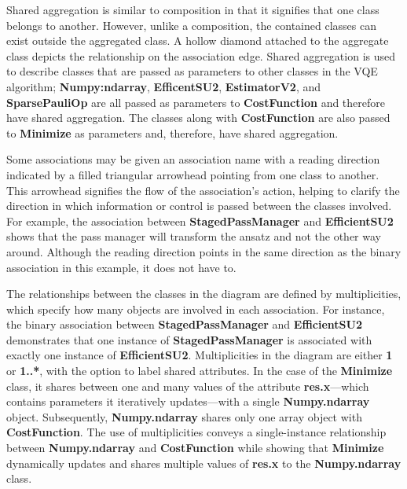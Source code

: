 \documentclass{article}
\begin{document}
Shared aggregation is similar to composition in that it signifies that one class belongs to another\cite{Seidl_Scholz_Huemer_Kappel_Duffy_2014}. However, unlike a composition, the contained classes can exist outside the aggregated class. A hollow diamond attached to the aggregate class depicts the relationship on the association edge. Shared aggregation is used to describe classes that are passed as parameters to other classes in the VQE algorithm; \textbf{Numpy:ndarray}, \textbf{EfficentSU2}, \textbf{EstimatorV2}, and \textbf{SparsePauliOp} are all passed as parameters to \textbf{CostFunction} and therefore have shared aggregation. The classes along with \textbf{CostFunction} are also passed to \textbf{Minimize} as parameters and, therefore, have shared aggregation. 

Some associations may be given an association name with a reading direction indicated by a filled triangular arrowhead pointing from one class to another. This arrowhead signifies the flow of the association's action, helping to clarify the direction in which information or control is passed between the classes involved. For example, the association between \textbf{StagedPassManager} and \textbf{EfficientSU2} shows that the pass manager will transform the ansatz and not the other way around. Although the reading direction points in the same direction as the binary association in this example, it does not have to\cite{Seidl_Scholz_Huemer_Kappel_Duffy_2014}.

The relationships between the classes in the diagram are defined by multiplicities, which specify how many objects are involved in each association. For instance, the binary association between \textbf{StagedPassManager} and \textbf{EfficientSU2} demonstrates that one instance of \textbf{StagedPassManager} is associated with exactly one instance of \textbf{EfficientSU2}. Multiplicities in the diagram are either \textbf{1} or \textbf{1..*}, with the option to label shared attributes. In the case of the \textbf{Minimize} class, it shares between one and many values of the attribute \textbf{res.x}—which contains parameters it iteratively updates—with a single \textbf{Numpy.ndarray} object. Subsequently, \textbf{Numpy.ndarray} shares only one array object with \textbf{CostFunction}. The use of multiplicities conveys a single-instance relationship between \textbf{Numpy.ndarray} and \textbf{CostFunction} while showing that \textbf{Minimize} dynamically updates and shares multiple values of \textbf{res.x} to the \textbf{Numpy.ndarray} class.
\end{document}
